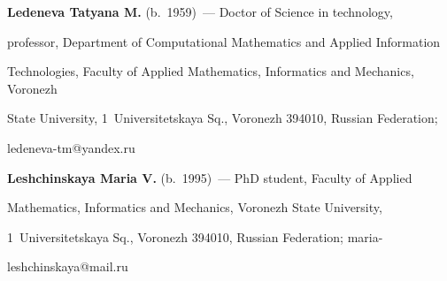      


     \Contr


     


     \vspace*{-3pt}





\noindent


\textbf{Ledeneva Tatyana M.} (b.\ 1959)~--- Doctor of Science in technology, 


professor, Department of Computational Mathematics and Applied Information 


Technologies, Faculty of Applied Mathematics, Informatics and Mechanics, Voronezh 


State University, 1~Universitetskaya Sq., Voronezh 394010, Russian Federation; 


\mbox{ledeneva-tm@yandex.ru}





\vspace*{3pt}





\noindent


\textbf{Leshchinskaya Maria V.} (b.\ 1995)~--- PhD student, Faculty of Applied 


Mathematics, Informatics and Mechanics, Voronezh State University, 


1~Universitetskaya Sq., Voronezh 394010, Russian Federation; maria-


\mbox{leshchinskaya@mail.ru}











\label{end\stat}





\renewcommand{\bibname}{\protect\rm Литература} 


